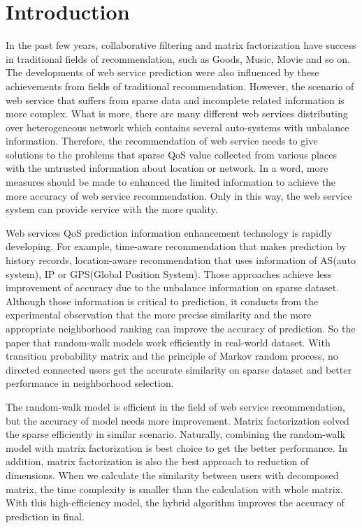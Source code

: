 \documentclass[conference]{IEEEtran}
\begin{document}
\section{Introduction}
\par In the past few years, collaborative filtering and matrix factorization have success in traditional fields of recommendation, such as Goods, Music, Movie and so on. The developments of web service prediction were also influenced by these achievements from fields of traditional recommendation. However, the scenario of web service that suffers from sparse data and incomplete related information is more complex. What is more, there are many different web services distributing over heterogeneous network which contains several auto-systems with unbalance information. Therefore, the recommendation of web service needs to give solutions to the problems that sparse QoS value collected from various places with the untrusted information about location or network. In a word, more measures should be made to enhanced the limited information to achieve the more accuracy of web service recommendation\cite{zheng_wsrec:_2009}\cite{zheng_qos-aware_2011}. Only in this way, the web service system can provide service with the more quality.
\par Web services QoS prediction information enhancement technology is rapidly developing. For example, time-aware recommendation that makes prediction by history records, location-aware recommendation\cite{liu_location-aware_2016}\cite{xia_domain-aware_2014}\cite{tang_location-aware_2012} that uses information of AS(auto system), IP or GPS(Global Position System). Those approaches achieve less improvement of accuracy due to the unbalance information on sparse dataset. Although those information is critical to prediction, it conducts from the experimental observation that the more precise similarity and the more appropriate neighborhood ranking\cite{lo_efficient_2014} can improve the accuracy of prediction. So the paper that random-walk models\cite{yin_network_2017}\cite{park_comparative_2017} work efficiently in real-world dataset. With transition probability matrix and the principle of Markov random process\cite{mohammed_markov_2016}, no directed connected users get the accurate similarity on sparse dataset and better performance in neighborhood selection.
\par The random-walk model is efficient in the field of web service recommendation, but the accuracy of model needs more improvement. Matrix factorization\cite{yu_personalized_2014}\cite{ma_predicting_2015} solved the sparse efficiently in similar scenario. Naturally, combining the random-walk model with matrix factorization is best choice to get the better performance. In addition, matrix factorization is also the best approach to reduction of dimensions. When we calculate the similarity between users with decomposed matrix, the time complexity is smaller than the calculation with whole matrix. With this high-efficiency model\cite{rodriguez-mier_hybrid_2017}, the hybrid algorithm improves the accuracy of prediction in final.
\end{document}
